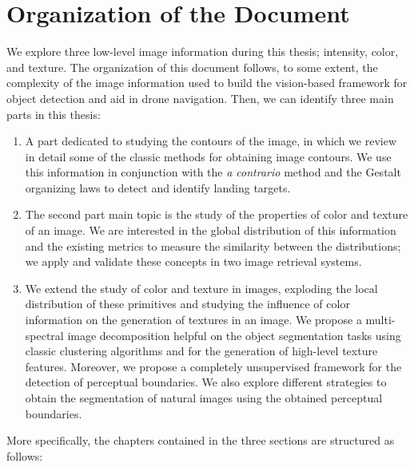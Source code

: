 \section*{Organization of the Document}
We explore three low-level image information during this thesis; intensity, color, and texture. The organization of this document follows, to some extent, the complexity of the image information used to build the vision-based framework for object detection and aid in drone navigation. Then, we can identify three main parts in this thesis:

\begin{enumerate}
	\item A part dedicated to studying the contours of the image, in which we review in detail some of the classic methods for obtaining image contours. We use this information in conjunction with the \textit{a contrario} method and the Gestalt organizing laws to detect and identify landing targets.
	\item The second part main topic is the study of the properties of color and texture of an image. We are interested in the global distribution of this information and the existing metrics to measure the similarity between the distributions; we apply and validate these concepts in two image retrieval systems.
	\item We extend the study of color and texture in images, exploding the local distribution of these primitives and studying the influence of color information on the generation of textures in an image. We propose a multi-spectral image decomposition helpful on the object segmentation tasks using classic clustering algorithms and for the generation of high-level texture features. Moreover, we propose a completely unsupervised framework for the detection of perceptual boundaries. We also explore different strategies to obtain the segmentation of natural images using the obtained perceptual boundaries.
\end{enumerate}

More specifically, the chapters contained in the three sections are structured as follows:


